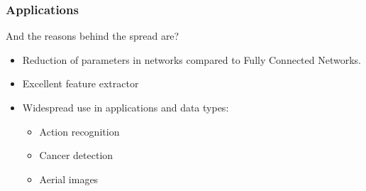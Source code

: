 \documentclass{beamer}
\begin{document}
\begin{frame}
\frametitle{Applications}

And the reasons behind the spread are?

\begin{itemize}
\item Reduction of parameters in networks compared to Fully Connected Networks.
\item Excellent feature extractor
\item Widespread use in applications and data types:
\begin{itemize}
\item Action recognition
\item Cancer detection
\item Aerial images
\end{itemize}
\end{itemize}



\end{frame}
\end{document}
